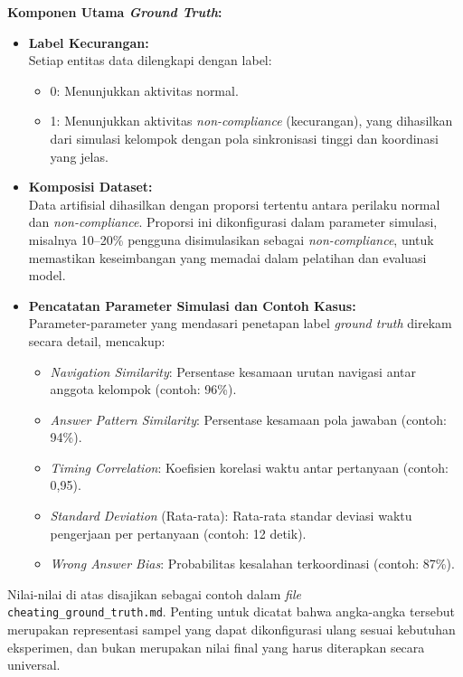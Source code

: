 \textbf{Komponen Utama \textit{Ground Truth}:}
\begin{itemize}
    \item \textbf{Label Kecurangan:} \\
    Setiap entitas data dilengkapi dengan label:
    \begin{itemize}
        \item 0: Menunjukkan aktivitas normal.
        \item 1: Menunjukkan aktivitas \textit{non-compliance} (kecurangan), yang dihasilkan dari simulasi kelompok dengan pola sinkronisasi tinggi dan koordinasi yang jelas.
    \end{itemize}
    \item \textbf{Komposisi Dataset:} \\
    Data artifisial dihasilkan dengan proporsi tertentu antara perilaku normal dan \textit{non-compliance}. Proporsi ini dikonfigurasi dalam parameter simulasi, misalnya 10--20\% pengguna disimulasikan sebagai \textit{non-compliance}, untuk memastikan keseimbangan yang memadai dalam pelatihan dan evaluasi model.
    \item \textbf{Pencatatan Parameter Simulasi dan Contoh Kasus:} \\
    Parameter-parameter yang mendasari penetapan label \textit{ground truth} direkam secara detail, mencakup:
    \begin{itemize}
        \item \textit{Navigation Similarity}: Persentase kesamaan urutan navigasi antar anggota kelompok (contoh: 96\%).
        \item \textit{Answer Pattern Similarity}: Persentase kesamaan pola jawaban (contoh: 94\%).
        \item \textit{Timing Correlation}: Koefisien korelasi waktu antar pertanyaan (contoh: 0,95).
        \item \textit{Standard Deviation} (Rata-rata): Rata-rata standar deviasi waktu pengerjaan per pertanyaan (contoh: 12 detik).
        \item \textit{Wrong Answer Bias}: Probabilitas kesalahan terkoordinasi (contoh: 87\%).
    \end{itemize}
\end{itemize}

Nilai-nilai di atas disajikan sebagai contoh dalam \textit{file} \texttt{cheating\_ground\_truth.md}. Penting untuk dicatat bahwa angka-angka tersebut merupakan representasi sampel yang dapat dikonfigurasi ulang sesuai kebutuhan eksperimen, dan bukan merupakan nilai final yang harus diterapkan secara universal.

